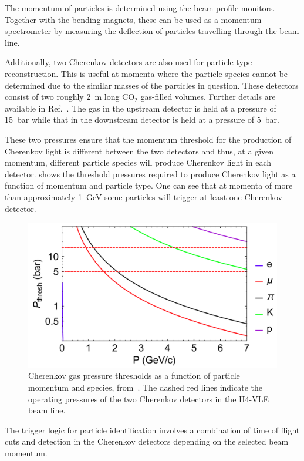 The momentum of particles is determined using the beam profile monitors.
Together with the bending magnets, these can be used as a momentum spectrometer by measuring the deflection of particles travelling through the beam line.

Additionally, two Cherenkov detectors are also used for particle type reconstruction.
This is useful at momenta where the particle species cannot be determined due to the similar masses of the particles in question.
These detectors consist of two roughly \SI{2}{\m} long $\text{CO}_{2}$ gas-filled volumes. Further details are available in Ref.~\cite{vleCherenkov}.
The gas in the upstream detector is held at a pressure of \SI{15}{\bar} while that in the downstream detector is held at a pressure of \SI{5}{\bar}.

These two pressures ensure that the momentum threshold for the production of Cherenkov light is different between the two detectors and thus, at a given momentum, different particle species will produce Cherenkov light in each detector.
 shows the threshold pressures required to produce Cherenkov light as a function of momentum and particle type.
One can see that at momenta of more than approximately \SI{1}{\GeV} some particles will trigger at least one Cherenkov detector.

\begin{figure}[h]
	\centering
	\includegraphics[width=.6\linewidth]{files/figures/protodune_detector/cherenkovThresh}
	\caption[Cherenkov gas pressure thresholds as a function of particle momentum and species]{Cherenkov gas pressure thresholds as a function of particle momentum and species, from~\cite{boothBeamLineInstr}. The dashed red lines indicate the operating pressures of the two Cherenkov detectors in the H4-VLE beam line.}
	\label{fig:cherenkovThresh}
\end{figure}

The trigger logic for particle identification involves a combination of time of flight cuts and detection in the Cherenkov detectors depending on the selected beam momentum.

